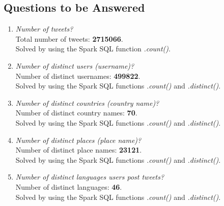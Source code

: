 \documentclass{article}
\begin{document}
\subsection*{Questions to be Answered}
\begin{enumerate}[label=\alph*)]
    \item \textit{Number of tweets?}\\
    
    Total number of tweets: \textbf{2715066}.\\
    
    Solved by using the Spark SQL function \textit{.count()}.\\
    
    \item \textit{Number of distinct users (username)?}\\
    
    Number of distinct usernames: \textbf{499822}.\\
    
    Solved by using the Spark SQL functions \textit{.count()} and  \textit{.distinct()}.\\
    
    \item \textit{Number of distinct countries (country name)?}\\
    
    Number of distinct country names: \textbf{70}.\\
    
    Solved by using the Spark SQL functions \textit{.count()} and  \textit{.distinct()}.\\
    
    \item \textit{Number of distinct places (place name)?}\\
    
    Number of distinct place names: \textbf{23121}.\\
    
    Solved by using the Spark SQL functions \textit{.count()} and  \textit{.distinct()}.\\
    
    \item \textit{Number of distinct languages users post tweets?}\\
    
    Number of distinct languages: \textbf{46}.\\
    
    Solved by using the Spark SQL functions \textit{.count()} and  \textit{.distinct()}.\\
    

\end{enumerate}
\end{document}
